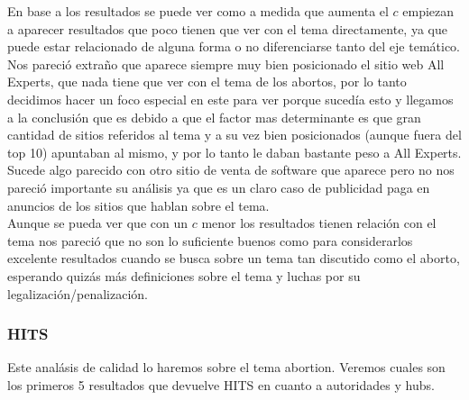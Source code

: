 En base a los resultados se puede ver como a medida que aumenta el $c$ empiezan a aparecer resultados que poco tienen que ver con el tema directamente, ya que puede estar relacionado de alguna forma o no diferenciarse tanto del eje temático.\\
Nos pareció extraño que aparece siempre muy bien posicionado el sitio web All Experts, que nada tiene que ver con el tema de los abortos, por lo tanto decidimos hacer un foco especial en este para ver porque sucedía esto y llegamos a la conclusión que es debido a que el factor mas determinante es que gran cantidad de sitios referidos al tema y a su vez bien posicionados (aunque fuera del top 10) apuntaban al mismo, y por lo tanto le daban bastante peso a All Experts.\\
Sucede algo parecido con otro sitio de venta de software que aparece pero no nos pareció importante su análisis ya que es un claro caso de publicidad paga en anuncios de los sitios que hablan sobre el tema.\\
Aunque se pueda ver que con un $c$ menor los resultados tienen relación con el tema nos pareció que no son lo suficiente buenos como para considerarlos excelente resultados cuando se busca sobre un tema tan discutido como el aborto, esperando quizás más definiciones sobre el tema y luchas por su legalización/penalización. 

\subsubsection{HITS}
Este analásis de calidad lo haremos sobre el tema abortion. Veremos cuales son los primeros 5 resultados que devuelve HITS en cuanto a autoridades y hubs.


